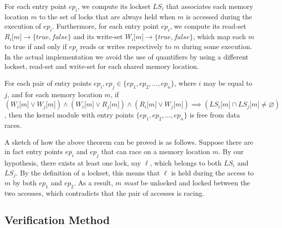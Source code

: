 For each entry point $\mathit{ep}_{i}$, we compute its lockset $\mathit{LS}_{i}$ that associates each memory location $m$ to the set of locks that are always held when $m$ is accessed during the execution of $\mathit{ep}_{i}$. Furthermore, for each entry point $\mathit{ep}_{i}$, we compute its read-set $R_{i}\lbrack m\rbrack \rightarrow \{true, false\}$ and its write-set $W_{i}\lbrack m\rbrack \rightarrow \{true, false\}$, which map each $m$ to true if and only if $\mathit{ep}_{i}$ reads or writes respectively to $m$ during some execution. In the actual implementation we avoid the use of quantifiers by using a different lockset, read-set and write-set for each shared memory location. 

\begin{theorem}
\label{theorem:locksets}
For each pair of entry points $\mathit{ep}_{i}, \mathit{ep}_{j}\in \{\mathit{ep}_{1}, \mathit{ep}_{2}, ..., \mathit{ep}_{n}\}$, where $i$ may be equal to $j$, and for each memory location $m$, if $(W_{i}\lbrack m\rbrack \vee W_{j}\lbrack m\rbrack) \wedge (W_{i}\lbrack m\rbrack \vee R_{j}\lbrack m\rbrack) \wedge (R_{i}\lbrack m\rbrack \vee W_{j}\lbrack m\rbrack) \implies (\mathit{LS}_{i}\lbrack m\rbrack \cap \mathit{LS}_{j}\lbrack m\rbrack \not= \varnothing)$, then the kernel module with entry points $\{\mathit{ep}_{1}, \mathit{ep}_{2}, \dotsc, \mathit{ep}_{n}\}$ is free from data races.
\end{theorem}

A sketch of how the above theorem can be proved is as follows. Suppose there are in fact entry points $\mathit{ep}_{i}$ and $\mathit{ep}_{j}$ that can race on a memory location $m$. By our hypothesis, there exists at least one lock, say $\ell$, which belongs to both $\mathit{LS}_{i}$ and $\mathit{LS}_{j}$. By the definition of a lockset, this means that $\ell$ is held during the access to $m$ by both $ep_1$ and $ep_2$. As a result, $m$ \emph{must} be unlocked and locked between the two accesses, which contradicts that the pair of accesses is racing.

\subsection{Verification Method}
\label{method}

